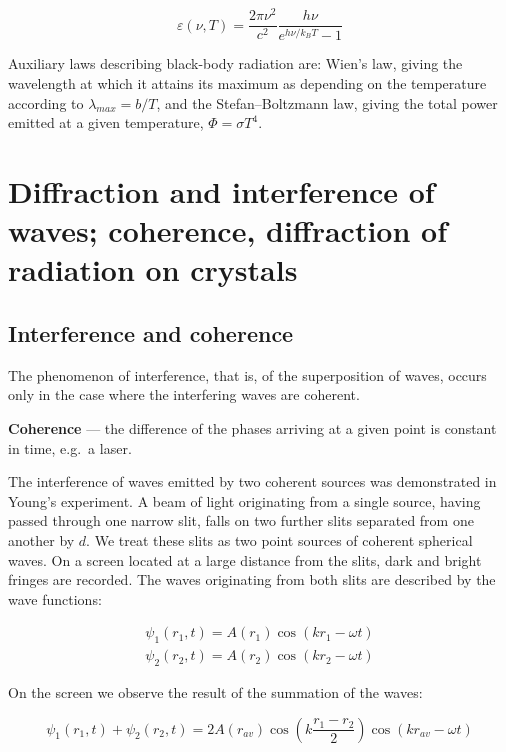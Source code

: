\[\varepsilon(\nu,T) = \frac{2\pi\nu^2}{c^2}\frac{h\nu}{e^{h\nu/k_BT} - 1}\]

Auxiliary laws describing black-body radiation are: Wien's law, giving the wavelength at which it attains its maximum as depending on the temperature according to $\lambda_{max} = b / T$, and the Stefan--Boltzmann law, giving the total power emitted at a given temperature, $\Phi = \sigma T^4$.

\section{Diffraction and interference of waves; coherence, diffraction of radiation on crystals}

\subsection{Interference and coherence}

The phenomenon of interference, that is, of the superposition of waves, occurs only in the case where the interfering waves are coherent.

\textbf{Coherence} --- the difference of the phases arriving at a given point is constant in time, e.g.\ a laser.

The interference of waves emitted by two coherent sources was demonstrated in Young's experiment. A beam of light originating from a single source, having passed through one narrow slit, falls on two further slits separated from one another by $d$. We treat these slits as two point sources of coherent spherical waves. On a screen located at a large distance from the slits, dark and bright fringes are recorded. The waves originating from both slits are described by the wave functions:

\begin{equation}
    \begin{matrix}
        \psi_{1}\left(r_{1},t\right) = A\left(r_{1}\right)\cos{\left(kr_{1} - \omega t\right)}\\
        \psi_{2}\left(r_{2},t\right) = A\left(r_{2}\right)\cos{\left(kr_{2} - \omega t\right)}
    \end{matrix}
\end{equation}

On the screen we observe the result of the summation of the waves:

\begin{equation}
    \psi_{1}\left(r_{1},t\right) + \psi_{2}\left(r_{2},t\right) = 2A\left(r_{av}\right)\cos{\left(k\frac{r_{1} - r_{2}}{2}\right)}\cos{\left(kr_{av} - \omega t\right)}
\end{equation}

